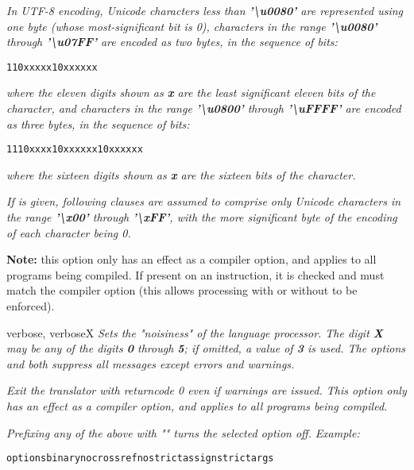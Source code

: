 \begin{description}
\emph{In UTF-8 encoding, Unicode characters less than \textbf{'\textbackslash{}u0080'} are
represented using one byte (whose most-significant bit is 0), characters
in the range \textbf{'\textbackslash{}u0080'} through \textbf{'\textbackslash{}u07FF'} are encoded
as two bytes, in the sequence of bits:}
\begin{alltt}
110xxxxx 10xxxxxx
\end{alltt}
\emph{where the eleven digits shown as \textbf{x} are the least
significant eleven bits of the character, and characters in the
range \textbf{'\textbackslash{}u0800'} through \textbf{'\textbackslash{}uFFFF'} are encoded as
three bytes, in the sequence of bits:}
\begin{alltt}
1110xxxx 10xxxxxx 10xxxxxx
\end{alltt}
\emph{where the sixteen digits shown as \textbf{x} are the
sixteen bits of the character.}
 
\emph{If  is given, following clauses are assumed to comprise
only Unicode characters in the range \textbf{'\textbackslash{}x00'}
through \textbf{'\textbackslash{}xFF'}, with the more significant byte of the
encoding of each character being 0.}
\begin{shaded}\noindent
\textbf{Note:}
this option only has an effect as a compiler option, and applies to
all programs being compiled.  If present on an 
instruction, it is checked and must match the compiler option (this
allows processing with or without  to be
enforced).
\end{shaded}\indent
\item{verbose, verboseX}
\emph{Sets the "noisiness" of the language processor.
The digit \textbf{\emph{X}} may be any of the digits \textbf{0}
through \textbf{5}; if omitted, a value of \textbf{3} is used.
The options  and  both suppress all
messages except errors and warnings.}

\item[warnexit0]
\emph{Exit the translator with returncode 0 even if warnings are issued. This option only has an effect as a compiler option, and applies to all programs being compiled.}
\end{description}
 
\emph{Prefixing any of the above with "" turns the selected
option off.}
 \emph{Example:}
\begin{alltt}
options binary nocrossref nostrictassign strictargs
\end{alltt}
 
